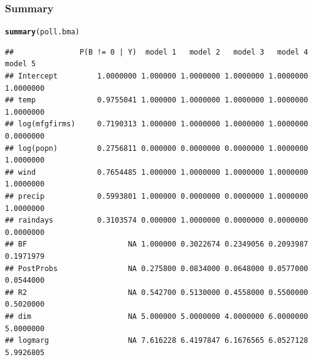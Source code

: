 \documentclass[]{beamer}\usepackage[]{graphicx}\usepackage[]{color}
\makeatletter
\newcommand{\hlstd}[1]{\textcolor[rgb]{0.345,0.345,0.345}{#1}}%
\newcommand{\hlkwd}[1]{\textcolor[rgb]{0.737,0.353,0.396}{\textbf{#1}}}%
\newenvironment{kframe}{%
 \def\at@end@of@kframe{}%
 \ifinner\ifhmode%
  \def\at@end@of@kframe{\end{minipage}}%
  \begin{minipage}{\columnwidth}%
 \fi\fi%
 \def\FrameCommand##1{\hskip\@totalleftmargin \hskip-\fboxsep
 \colorbox{shadecolor}{##1}\hskip-\fboxsep
     \hskip-\linewidth \hskip-\@totalleftmargin \hskip\columnwidth}%
 \MakeFramed {\advance\hsize-\width
   \@totalleftmargin\z@ \linewidth\hsize
   \@setminipage}}%
 {\par\unskip\endMakeFramed%
 \at@end@of@kframe}
\newenvironment{knitrout}{}{} %
\makeatother
\begin{document}
\begin{frame}[fragile]\frametitle{Summary}

\begin{small}
\begin{knitrout}
\color{fgcolor}\begin{kframe}
\begin{alltt}
\hlkwd{summary}\hlstd{(poll.bma)}
\end{alltt}
\begin{verbatim}
##               P(B != 0 | Y)  model 1   model 2   model 3   model 4   model 5
## Intercept         1.0000000 1.000000 1.0000000 1.0000000 1.0000000 1.0000000
## temp              0.9755041 1.000000 1.0000000 1.0000000 1.0000000 1.0000000
## log(mfgfirms)     0.7190313 1.000000 1.0000000 1.0000000 1.0000000 0.0000000
## log(popn)         0.2756811 0.000000 0.0000000 0.0000000 1.0000000 1.0000000
## wind              0.7654485 1.000000 1.0000000 1.0000000 1.0000000 1.0000000
## precip            0.5993801 1.000000 0.0000000 0.0000000 1.0000000 1.0000000
## raindays          0.3103574 0.000000 1.0000000 0.0000000 0.0000000 0.0000000
## BF                       NA 1.000000 0.3022674 0.2349056 0.2093987 0.1971979
## PostProbs                NA 0.275800 0.0834000 0.0648000 0.0577000 0.0544000
## R2                       NA 0.542700 0.5130000 0.4558000 0.5500000 0.5020000
## dim                      NA 5.000000 5.0000000 4.0000000 6.0000000 5.0000000
## logmarg                  NA 7.616228 6.4197847 6.1676565 6.0527128 5.9926805
\end{verbatim}
\end{kframe}
\end{knitrout}
\end{small}

\end{frame}
\end{document}
